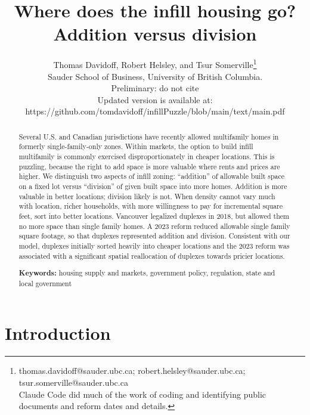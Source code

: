 \documentclass[12pt]{article}
\begin{document}
\title{Where does the infill housing go?\\Addition versus division}
\author{Thomas Davidoff, Robert Helsley, and Tsur Somerville\thanks{thomas.davidoff@sauder.ubc.ca; robert.helsley@sauder.ubc.ca; tsur.somerville@sauder.ubc.ca\\Claude Code did much of the work of coding and identifying public documents and reform dates and details.}\\Sauder School of Business, University of British Columbia. \\Preliminary: do not cite\\Updated version is available at:\\ https://github.com/tomdavidoff/infillPuzzle/blob/main/text/main.pdf}
  \maketitle

\onehalfspacing
\begin{abstract}

Several U.S. and Canadian jurisdictions have recently allowed  multifamily homes in formerly single-family-only zones. Within markets, the option to build infill multifamily is commonly exercised disproportionately in cheaper locations. This is puzzling, because the right to add space is more valuable where rents and prices are higher. We distinguish two aspects of infill zoning: ``addition'' of allowable built space on a fixed lot versus ``division'' of given built space into more homes. Addition is more valuable in better locations; division likely is not. When density cannot vary much with location, richer households, with more willingness to pay for incremental square feet, sort into better locations. Vancouver legalized duplexes in 2018, but allowed them no more space than single family homes. A 2023 reform reduced allowable single family square footage, so that duplexes represented addition and division. Consistent with our model, duplexes initially sorted heavily into cheaper locations and the 2023 reform was associated with a significant spatial reallocation of duplexes towards pricier locations. 
\par\bigskip
\textbf{Keywords:} housing supply and markets, government policy, regulation, state and local government
\end{abstract}

\section{\label{sec:intro}Introduction}
\end{document}
